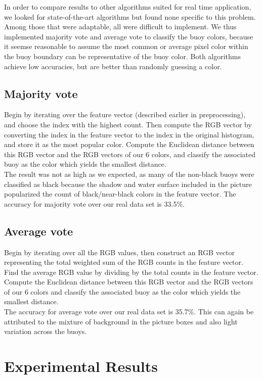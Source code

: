 \documentclass{article} %
\begin{document}
In order to compare results to other algorithms suited for real time application, we looked for state-of-the-art algorithms but found none specific to this problem. Among those that were adaptable, all were difficult to implement. We thus implemented majority vote and average vote to classify the buoy colors, because it seemse reasonable to assume the most common or average pixel color within the buoy boundary can be representative of the buoy color. Both algorithms achieve low accuracies, but are better than randomly guessing a color.

\subsection{Majority vote}
Begin by iterating over the feature vector (described earlier in preprocessing), and choose the index with the highest count. Then compute the RGB vector by converting the index in the feature vector to the index in the original histogram, and store it as the most popular color. Compute the Euclidean distance between this RGB vector and the RGB vectors of our 6 colors, and classify the associated buoy as the color which yields the smallest distance.\\
The result was not as high as we expected, as many of the non-black buoys were classified as black because the shadow and water surface included in the picture popularized the count of black/near-black colors in the feature vector. The accuracy for majority vote over our real data set is 33.5\%.

\subsection{Average vote}
Begin by iterating over all the RGB values, then construct an RGB vector representing the total weighted sum of the RGB counts in the feature vector. Find the average RGB value by dividing by the total counts in the feature vector. Compute the Euclidean distance between this RGB vector and the RGB vectors of our 6 colors and classify the associated buoy as the color which yields the smallest distance.\\
The accuracy for average vote over our real data set is 35.7\%. This can again be attributed to the mixture of background in the picture boxes and also light variation across the buoys.

\section{Experimental Results}
\end{document}
